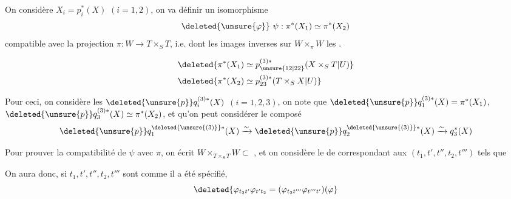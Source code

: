 On considère $X_i=p_i^{*}(X)$ $(i=1,2)$, on va définir un isomorphisme
\[
\deleted{\unsure{\varphi}}\ \psi:\pi^{*}(X_1)\simeq\pi^{*}(X_2)
\]
compatible avec la projection $\pi:W\longrightarrow T\times_S T$, i.e. dont les images inverses sur $W\times_{\pi}W$  les .

\[
\begin{aligned}
&\deleted{\pi^{*}(X_1)\simeq p_{\unsure{12|22}}^{(3)*}(X\times_S T|U)}\\
&\deleted{\pi^{*}(X_2)\simeq p_{23}^{(3)*}(T\times_S X|U)}
\end{aligned}
\]

Pour ceci, on considère les $\deleted{\unsure{p}}q_i^{(3)*}(X)$ $(i=1,2,3)$,
on note que $\deleted{\unsure{p}}q_1^{(3)*}(X)=\pi^{*}(X_1)$, $\deleted{\unsure{p}}q_3^{(3)*}(X)\simeq\pi^{*}(X_2)$, et qu'on peut considérer le composé
\[
\deleted{\unsure{p}}q_1^{\deleted{\unsure{(3)}}*}(X)\xrightarrow{\sim}\deleted{\unsure{p}}q_2^{\deleted{\unsure{(3)}}*}(X)\xrightarrow{\sim}q_3^{*}(X)
\]

Pour prouver la compatibilité de $\psi$ avec $\pi$,
on écrit $W\times_{T\times_S T}W\subset$
, et on considère le   de
  correspondant aux  $(t_1,t',t'',t_2,t''')$ tels que 


On aura donc, si $t_1,t',t'',t_2,t'''$ sont comme il a été spécifié,
\[
\deleted{\varphi_{t_2t'}\varphi_{t't_{2}}=(\varphi_{t_2t'''}\varphi_{t'''t'})(\varphi}
\]
